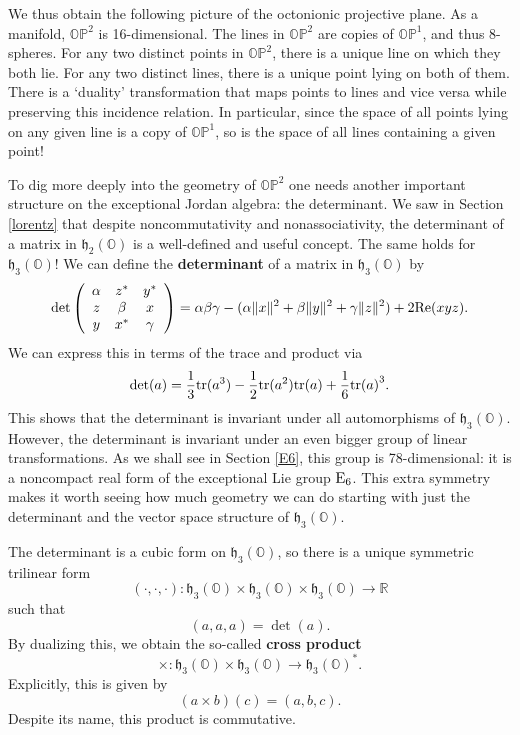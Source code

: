 \documentclass[12pt]{article}
\newcommand\R{{\mathbb R}}
\renewcommand\O{{\mathbb O}}
\newcommand\OP{{\mathbb {OP}}}
\newcommand{\E}{{\rm E}}
\newcommand{\h}{{\mathfrak {h}}}
\renewcommand{\Re}{{\rm Re}}
\newcommand{\maps}{\colon}
\newcommand{\tr}{{\rm tr}}
\begin{document}
We thus obtain the following picture of the octonionic projective plane.
As a manifold, $\OP^2$ is 16-dimensional.  The lines in $\OP^2$ are
copies of $\OP^1$, and thus 8-spheres.  For any two distinct points in
$\OP^2$, there is a unique line on which they both lie.  For any two
distinct lines, there is a unique point lying on both of them.  There is
a `duality' transformation that maps points to lines and vice versa
while preserving this incidence relation.  In particular, since the
space of all points lying on any given line is a copy of $\OP^1$, so 
is the space of all lines containing a given point!

To dig more deeply into the geometry of $\OP^2$ one needs another
important structure on the exceptional Jordan algebra: the determinant. 
We saw in Section \ref{lorentz} that despite noncommutativity and
nonassociativity, the determinant of a matrix in $\h_2(\O)$ is a
well-defined and useful concept.  The same holds for $\h_3(\O)$!   We
can define the {\bf determinant} of a matrix in $\h_3(\O)$ by
\[ 
\det \left( \begin{array}{ccc}  
                         \alpha  &  z^*  & y^*         \\  
                         z       & \beta & x           \\ 
                         y       & x^* & \gamma   \end{array} \right) = 
\alpha \beta \gamma - (\alpha \|x\|^2 + \beta \|y\|^2 + \gamma \|z\|^2)
+ 2 \Re(xyz) .
\]  
We can express this in terms of the trace and product via
\[   \det(a) = {1\over 3} \tr(a^3) - {1\over 2} \tr(a^2) \tr(a) + 
               {1\over 6} {\tr(a)}^3  .\]
This shows that the determinant is invariant under all automorphisms of
$\h_3(\O)$.  However, the determinant is invariant under an even bigger
group of linear transformations.  As we shall see in Section \ref{E6},
this group is 78-dimensional: it is a noncompact real form of the
exceptional Lie group $\E_6$.  This extra symmetry makes it worth
seeing how much geometry we can do starting with just the determinant
and the vector space structure of $\h_3(\O)$.  

The determinant is a cubic form on $\h_3(\O)$, so there is a unique
symmetric trilinear form 
\[  (\cdot,\cdot,\cdot) \maps \h_3(\O) \times \h_3(\O) \times \h_3(\O)
\to \R \]
such that
\[      (a,a,a) = \det(a) .\]
By dualizing this, we obtain the so-called {\bf cross product}
\[  \times \maps \h_3(\O) \times \h_3(\O) \to \h_3(\O)^*. \]
Explicitly, this is given by
\[     (a \times b)(c) = (a,b,c) .\]
Despite its name, this product is commutative.  
\end{document}
